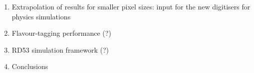 \begin{enumerate}
\item Extrapolation of results for smaller pixel sizes: input for the
  new digitisers for physics simulations

\item Flavour-tagging performance (?)
\item RD53 simulation framework (?)
\item Conclusions
  
\end{enumerate}

